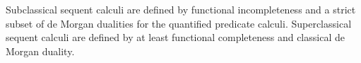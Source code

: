 





\usepackage[utf8]{inputenc}














































Subclassical sequent calculi are defined by functional incompleteness and a strict subset of de Morgan dualities for the quantified predicate calculi.
Superclassical sequent calculi are defined by at least functional completeness and classical de Morgan duality.


